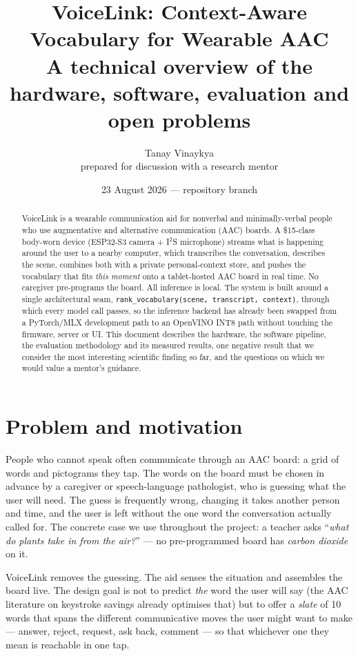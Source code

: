 \documentclass[11pt]{article}
\title{VoiceLink: Context-Aware Vocabulary for Wearable AAC\\
\large A technical overview of the hardware, software, evaluation and open problems}
\author{Tanay Vinaykya\\ \small prepared for discussion with a research mentor}
\date{23 August 2026 --- repository branch \code{main}}
\newcommand{\code}[1]{\texttt{#1}}
\begin{document}
\maketitle

\begin{abstract}
VoiceLink is a wearable communication aid for nonverbal and minimally-verbal
people who use augmentative and alternative communication (AAC) boards. A
\$15-class body-worn device (ESP32-S3 camera + I$^2$S microphone) streams what
is happening around the user to a nearby computer, which transcribes the
conversation, describes the scene, combines both with a private personal-context
store, and pushes the vocabulary that fits \emph{this moment} onto a
tablet-hosted AAC board in real time. No caregiver pre-programs the board.
All inference is local. The system is built around a single architectural seam,
\code{rank\_vocabulary(scene, transcript, context)}, through which every model
call passes, so the inference backend has already been swapped from a
PyTorch/MLX development path to an OpenVINO INT8 path without touching the
firmware, server or UI. This document describes the hardware, the software
pipeline, the evaluation methodology and its measured results, one negative
result that we consider the most interesting scientific finding so far, and the
questions on which we would value a mentor's guidance.
\end{abstract}

\tableofcontents
\medskip

\section{Problem and motivation}
People who cannot speak often communicate through an AAC board: a grid of words
and pictograms they tap. The words on the board must be chosen in advance by a
caregiver or speech-language pathologist, who is guessing what the user will need.
The guess is frequently wrong, changing it takes another person and time, and
the user is left without the one word the conversation actually called for.
The concrete case we use throughout the project: a teacher asks
``\emph{what do plants take in from the air?}'' --- no pre-programmed board has
\emph{carbon dioxide} on it.

VoiceLink removes the guessing. The aid senses the situation and assembles the
board live. The design goal is not to predict \emph{the} word the user will say
(the AAC literature on keystroke savings already optimises that) but to offer a
\emph{slate} of 10 words that spans the different communicative moves the user
might want to make --- answer, reject, request, ask back, comment --- so that
whichever one they mean is reachable in one tap.
\end{document}
